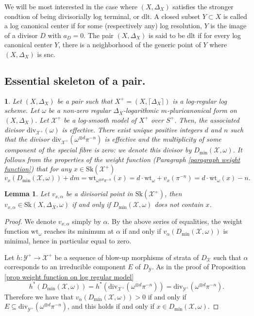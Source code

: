 \documentclass{amsart}%
\numberwithin{equation}{subsection}
\theoremstyle{plain2}
\newtheorem{lemma}[equation]{Lemma}
\theoremstyle{definition2}
\theoremstyle{stepstyle}
\theoremstyle{point}
\theoremstyle{subpoint}
\newtheorem{subpoint}[equation]{}%
\newcommand{\spa}[1]{\begin{subpoint}#1\end{subpoint}}           %
\newcommand{\cX}{\ensuremath{\mathscr{X}}}
\newcommand{\cY}{\ensuremath{\mathscr{Y}}}
\renewcommand{\cY}{\ensuremath{\mathscr{Y}}}
\newcommand{\divisor}{\mathrm{div}}
\newcommand{\weight}{\mathrm{wt}}
\newcommand{\Sk}{\mathrm{Sk}}
\begin{document}
We will be most interested in the case where $(X,\Delta_X)$ satisfies the stronger condtion of being divisorially log terminal, or dlt. A closed subset $Y \subset X$ is called a log canonical center if for some (respectively any) log resolution, $Y$ is the image of a divisor $D$ with $a_D=0$. The pair $(X,\Delta_X)$ is said to be dlt if for every log canonical center $Y$, there is a neighborhood of the generic point of $Y$ where $(X,\Delta_X)$ is snc.

\subsection{Essential skeleton of a pair.}
\spa{Let $(X,\Delta_X)$ be a pair such that $X^+=(X,\lceil \Delta_X \rceil)$ is a log-regular log scheme. Let $\omega$ be a non-zero regular $\Delta_X$-logarithmic $m$-pluricanonical form on $(X,\Delta_X)$. Let $\cX^+$ be a log-smooth model of $X^+$ over $S^+$. Then, the associated divisor $\divisor_{\cX^+}(\omega)$ is effective. There exist unique positive integers $d$ and $n$ such that the divisor $\divisor_{\cX^+}(\omega^{\otimes d} \pi^{-n})$ is effective and the multiplicity of some component of the special fibre is zero: we denote this divisor by $D_{\min}(\cX,\omega)$. It follows from the properties of the weight function (Paragraph \ref{paragraph weight function}) that for any $x \in \Sk(\cX^+)$ $$v_x(D_{\min}(\cX,\omega)) + dm = \weight_{\omega^{\otimes d}\pi^{-n}}(x)= d \cdot \weight_{\omega} + v_x(\pi^{-n}) = d \cdot \weight_{\omega}(x) -n.$$
}
\begin{lemma} \label{lemma characterization minimal points}
Let $v_{x,\alpha}$ be a divisorial point in $\Sk(\cX^+)$, then $v_{x,\alpha} \in \Sk(X,\Delta_X, \omega)$ if and only if $D_{\min}(\cX,\omega)$ does not contain $x$.
\end{lemma}
\begin{proof}
We denote $v_{x,\alpha}$ simply by $\alpha$. By the above series of equalities, the weight function $\weight_{\omega}$ reaches its minimum at $\alpha$ if and only if $v_\alpha(D_{\min}(\cX,\omega))$ is minimal, hence in particular equal to zero.

Let $h: \cY^+ \rightarrow \cX^+$ be a sequence of blow-up morphisms of strata of $D_\cX$ such that $\alpha$ corresponds to an irreducible component $E$ of $D_\cY$. As in the proof of Proposition \ref{prop weight function on log regular model} $$h^*(D_{\min}(\cX,\omega))=h^*(\divisor_{\cX^+} (\omega^{\otimes d} \pi^{-n}))= \divisor_{\cY^+} (\omega^{\otimes d} \pi^{-n}).$$ Therefore we have that $v_\alpha(D_{\min}(\cX,\omega)) >0$ if and only if $E \subseteq \divisor_{\cY^+} (\omega^{\otimes d} \pi^{-n})$, and this holds if and only if $x \in D_{\min}(\cX,\omega)$.
\end{proof}
\end{document}
